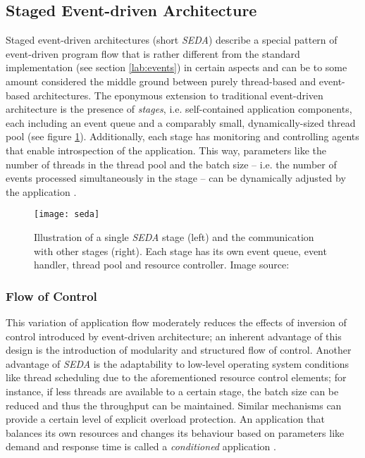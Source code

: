 \subsection{Staged Event-driven Architecture}
\label{sec:seda}
Staged event-driven architectures (short \textit{SEDA}) describe a special pattern of event-driven program flow that is rather different from the standard implementation (see section \ref{lab:events}) in certain aspects and can be to some amount considered the middle ground between purely thread-based and event-based architectures. The eponymous extension to traditional event-driven architecture is the presence of \textit{stages}, i.e. self-contained application components, each including an event queue and a comparably small, dynamically-sized thread pool (see figure \ref{fig:seda}). Additionally, each stage has monitoring and controlling agents that enable introspection of the application. This way, parameters like the number of threads in the thread pool and the batch size -- i.e. the number of events processed simultaneously in the stage -- can be dynamically adjusted by the application \cite{Welsh2001}. 

\begin{figure}
\centering\small
\setlength{\tabcolsep}{0mm}
  \texttt{[image: seda]}
\caption{
Illustration of a single \textit{SEDA} stage (left) and the communication with other stages (right). Each stage has its own event queue, event handler, thread pool and resource controller. Image source: \cite{Welsh2001}
}
\label{fig:seda}
\end{figure}

\subsubsection*{Flow of Control}
This variation of application flow moderately reduces the effects of inversion of control introduced by event-driven architecture; an inherent advantage of this design is the introduction of modularity and structured flow of control. Another advantage of \textit{SEDA} is the adaptability to low-level operating system conditions like thread scheduling due to the aforementioned resource control elements; for instance, if less threads are available to a certain stage, the batch size can be reduced and thus the throughput can be maintained. Similar mechanisms can provide a certain level of explicit overload protection. An application that balances its own resources and changes its behaviour based on parameters like demand and response time is called a \textit{conditioned} application \cite{Welsh2001}. 

